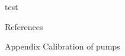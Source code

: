 \documentclass[fontsize=12pt,
		twoside,
		parskip=half,
		draft=false,
		DIV=18,
		BCOR=20mm,
		numbers=noenddot,
]{scrbook} %
\begin{document}
%
\thispagestyle{empty}

%
\cleardoublepage
%
%
\thispagestyle{empty}
test
%
\cleardoublepage
%
\setcounter{page}{1}
%
\tableofcontents
%
\cleardoublepage
%
\listoffigures
%
\cleardoublepage
%
\listoftables
%
\cleardoublepage
%
\setcounter{page}{1}
%

%

%

%

%
References 

Appendix
Calibration of pumps
\end{document}
